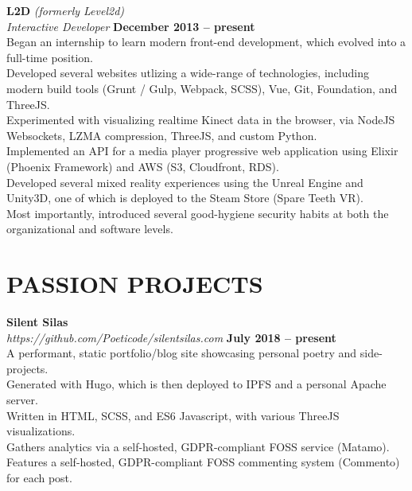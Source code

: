 \documentclass[margin,line]{resume}
\begin{document}
\begin{resume}
    \textbf{\listing L2D} \textsl{(formerly Level2d)} \vspace{2mm}\\\vspace{1mm}%
    \textsl{Interactive Developer} \hfill \textbf{December 2013 -- present}\\
    Began an internship to learn modern front-end development, which evolved into a full-time position.\\
    Developed several websites utlizing a wide-range of technologies, including modern build tools (Grunt / Gulp, Webpack, SCSS), Vue, Git, Foundation, and ThreeJS.\\
    Experimented with visualizing realtime Kinect data in the browser, via NodeJS Websockets, LZMA compression, ThreeJS, and custom Python. \\
    Implemented an API for a media player progressive web application using Elixir (Phoenix Framework) and AWS (S3, Cloudfront, RDS). \\
    Developed several mixed reality experiences using the Unreal Engine and Unity3D, one of which is deployed to the Steam Store (Spare Teeth VR). \\
    Most importantly, introduced several good-hygiene security habits at both the organizational and software levels.

\sectionline

    \section{\mysidestyle \textbf{\large{P}\small{ASSION} \large{P}\small{ROJECTS}}}

    \textbf{\listing Silent Silas}\\
    \textsl{https://github.com/Poeticode/silentsilas.com} \hfill \textbf{July 2018 -- present}\\
    A performant, static portfolio/blog site showcasing personal poetry and side-projects.\\
    Generated with Hugo, which is then deployed to IPFS and a personal Apache server.\\
    Written in HTML, SCSS, and ES6 Javascript, with various ThreeJS visualizations.\\
    Gathers analytics via a self-hosted, GDPR-compliant FOSS service (Matamo).\\
    Features a self-hosted, GDPR-compliant FOSS commenting system (Commento) for each post. 


\end{resume}
\end{document}
